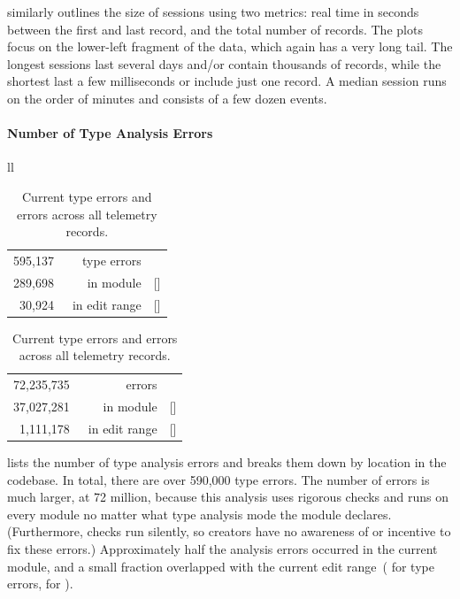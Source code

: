 \documentclass[english,submission,cleveref]{programming}
\begin{document}
 similarly outlines the size of sessions using two metrics:
real time in seconds between the first and last record, and the total number of
records.
The plots focus
on the lower-left fragment of the data, which again has a very long tail.
The longest sessions last several days and/or contain thousands of records,
while the shortest last a few milliseconds or include just one record.
A median session runs on the order of minutes and consists of a few dozen events.


\paragraph{Number of Type Analysis Errors}
\label{s:count-analysis-errors}

\begin{table}[t]\centering
  \caption{Current type errors and \FS{} errors across all telemetry records.}
  \label{t:count-analysis-errors}
  \begin{tabular}[t]{ll}
    \begin{tabular}[t]{r@{~~}r@{~}r}
      595,137 & type errors \\
      289,698 & \hbox{}~in module & [\pct{48.68}] \\
       30,924 & \hbox{}~in edit range & [\pct{5.20}]
    \end{tabular}
    \begin{tabular}[t]{r@{~}r@{~}r}
      72,235,735 & {\FS{} errors} \\
      37,027,281 & \hbox{}~in module & [\pct{51.26}] \\
       1,111,178 & \hbox{}~in edit range & [\pct{1.54}]
    \end{tabular}
  \end{tabular}
\end{table}

 lists the number of type analysis errors
and breaks them down by location in the codebase.
In total, there are over 590,000 type errors.
The number of \FS{} errors is much larger, at 72 million, because this analysis
uses rigorous checks and runs on every module no matter what type analysis
mode the module declares.
(Furthermore, \FS{} checks run silently, so creators have no
awareness of or incentive to fix these errors.)
Approximately half the analysis errors occurred in the current module,
and a small fraction overlapped with the current edit range~( for
type errors,  for \FS{}).
\end{document}
